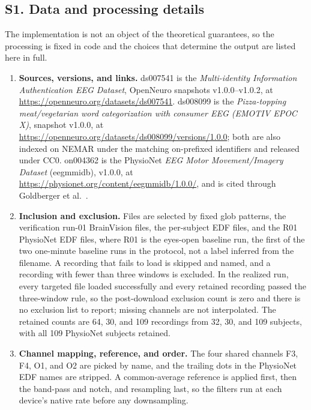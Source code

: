 \subsection{S1. Data and processing
details}\label{s1.-data-and-processing-details}

The implementation is not an object of the theoretical guarantees, so
the processing is fixed in code and the choices that determine the
output are listed here in full.

\begin{enumerate}
\def\labelenumi{\arabic{enumi}.}
\tightlist
\item
  \textbf{Sources, versions, and links.} ds007541 is the
  \emph{Multi-identity Information Authentication EEG Dataset},
  OpenNeuro snapshots v1.0.0--v1.0.2, at
  \url{https://openneuro.org/datasets/ds007541}. ds008099 is the
  \emph{Pizza-topping meat/vegetarian word categorization with consumer
  EEG (EMOTIV EPOC X)}, snapshot v1.0.0, at
  \url{https://openneuro.org/datasets/ds008099/versions/1.0.0}; both are
  also indexed on NEMAR under the matching on-prefixed identifiers and
  released under CC0. on004362 is the PhysioNet \emph{EEG Motor
  Movement/Imagery Dataset} (eegmmidb), v1.0.0, at
  \url{https://physionet.org/content/eegmmidb/1.0.0/}, and is cited
  through Goldberger et al.~\cite{goldberger2000}.
\item
  \textbf{Inclusion and exclusion.} Files are selected by fixed glob
  patterns, the verification run-01 BrainVision files, the per-subject
  EDF files, and the R01 PhysioNet EDF files, where R01 is the eyes-open
  baseline run, the first of the two one-minute baseline runs in the
  protocol, not a label inferred from the filename. A recording that
  fails to load is skipped and named, and a recording with fewer than
  three windows is excluded. In the realized run, every targeted file
  loaded successfully and every retained recording passed the
  three-window rule, so the post-download exclusion count is zero and
  there is no exclusion list to report; missing channels are not
  interpolated. The retained counts are 64, 30, and 109 recordings from
  32, 30, and 109 subjects, with all 109 PhysioNet subjects retained.
\item
  \textbf{Channel mapping, reference, and order.} The four shared
  channels F3, F4, O1, and O2 are picked by name, and the trailing dots
  in the PhysioNet EDF names are stripped. A common-average reference is
  applied first, then the band-pass and notch, and resampling last, so
  the filters run at each device's native rate before any downsampling.

\end{enumerate}
